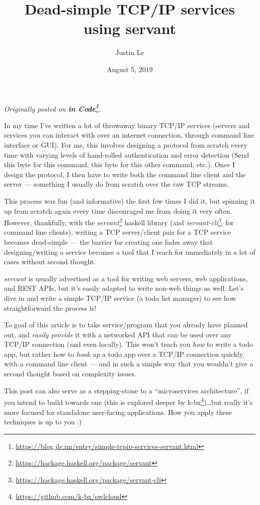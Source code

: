 \documentclass[]{article}
\title{Dead-simple TCP/IP services using servant}
\author{Justin Le}
\date{August 5, 2019}
\renewcommand{\href}[2]{#2\footnote{\url{#1}}}
\begin{document}
\maketitle

\emph{Originally posted on
\textbf{\href{https://blog.jle.im/entry/simple-tcpip-services-servant.html}{in
Code}}.}

In my time I've written a lot of throwaway binary TCP/IP services (servers and
services you can interact with over an internet connection, through command line
interface or GUI). For me, this involves designing a protocol from scratch every
time with varying levels of hand-rolled authentication and error detection (Send
this byte for this command, this byte for this other command, etc.). Once I
design the protocol, I then have to write both the command line client and the
server --- something I usually do from scratch over the raw TCP streams.

This process was fun (and informative) the first few times I did it, but
spinning it up from scratch again every time discouraged me from doing it very
often. However, thankfully, with the
\emph{\href{https://hackage.haskell.org/package/servant}{servant}} haskell
library (and
\emph{\href{https://hackage.haskell.org/package/servant-cli}{servant-cli}}, for
command line clients), writing a TCP server/client pair for a TCP service
becomes dead-simple --- the barrier for creating one fades away that
designing/writing a service becomes a tool that I reach for immediately in a lot
of cases without second thought.

\emph{servant} is usually advertised as a tool for writing web servers, web
applications, and REST APIs, but it's easily adapted to write non-web things as
well. Let's dive in and write a simple TCP/IP service (a todo list manager) to
see how straightforward the process is!

To goal of this article is to take service/program that you already have planned
out, and \emph{easily provide} it with a networked API that can be used over any
TCP/IP connection (and even locally). This won't teach you \emph{how} to write a
todo app, but rather how to \emph{hook up} a todo app over a TCP/IP connection
quickly, with a command line client --- and in such a simple way that you
wouldn't give a second thought based on complexity issues.

This post can also serve as a stepping-stone to a ``microservices
architecture'', if you intend to build towards one (this is explored deeper by
\href{https://github.com/k-bx/owlcloud}{k-bx})\ldots but really it's more
focused for standalone user-facing applications. How you apply these techniques
is up to you :)
\end{document}
